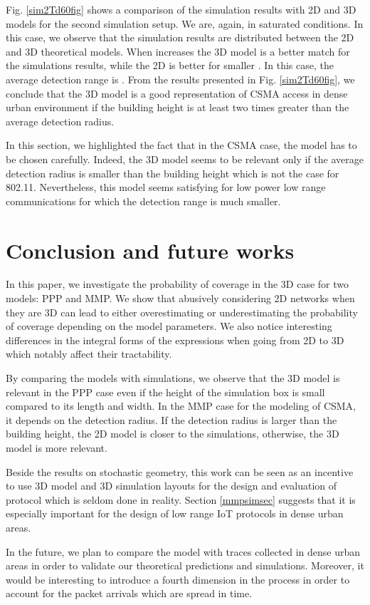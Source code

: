 \documentclass{sig-alternate-05-2015}
\begin{document}
Fig. \ref{sim2Td60fig} shows a comparison of the simulation results with 2D and 3D models for the second simulation setup. We are, again, in saturated conditions. In this case, we observe that the simulation results are distributed between the 2D and 3D theoretical models. When  increases the 3D model is a better match for the simulations results, while the 2D is better for smaller . In this case, the average detection range is . From the results presented in Fig. \ref{sim2Td60fig}, we conclude that the 3D model is a good representation of CSMA access in dense urban environment if the building height is at least two times greater than the average detection radius.

In this section, we highlighted the fact that in the CSMA case, the model has to be chosen carefully. Indeed, the 3D model seems to be relevant only if the average detection radius is smaller than the building height which is not the case for 802.11. Nevertheless, this model seems satisfying for low power low range communications for which the detection range is much smaller.

\section{Conclusion and future works}
\label{conclusec}

In this paper, we investigate the probability of coverage in the 3D case for two models: PPP and MMP. We show that abusively considering 2D networks when they are 3D can lead to either overestimating or underestimating the probability of coverage depending on the model parameters. We also notice interesting differences in the integral forms of the expressions when going from 2D to 3D which notably affect their tractability. 

By comparing the models with simulations, we observe that the 3D model is relevant in the PPP case even if the height of the simulation box is small compared to its length and width. In the MMP case for the modeling of CSMA, it depends on the detection radius. If the detection radius is larger than the building height, the 2D model is closer to the simulations, otherwise, the 3D model is more relevant.

Beside the results on stochastic geometry, this work can be seen as an incentive to use 3D model and 3D simulation layouts for the design and evaluation of protocol which is seldom done in reality. Section \ref{mmpsimsec} suggests that it is especially important for the design of low range IoT protocols in dense urban areas.

In the future, we plan to compare the model with traces collected in dense urban areas in order to validate our theoretical predictions and simulations. Moreover, it would be interesting to introduce a fourth dimension in the process in order to account for the packet arrivals which are spread in time.



   
\end{document}
